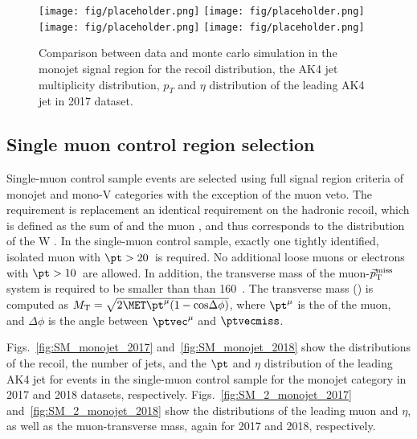 {\begin{figure}[htbp]
    \begin{center}
        \texttt{[image: fig/placeholder.png]}
        \texttt{[image: fig/placeholder.png]} \\
        \texttt{[image: fig/placeholder.png]}
        \texttt{[image: fig/placeholder.png]}
    \end{center}
    \caption{Comparison between data and monte carlo simulation in the monojet signal region for
        the recoil distribution, the AK4 jet multiplicity distribution,  $p_T$ and $\eta$
        distribution of the leading AK4  jet in 2017 dataset.}
    \label{fig:SR_pre_monoV_2018}
\end{figure}

\newpage

\subsection{Single muon control region selection}
\label{sec:selection_cr_1m}

Single-muon control sample events are selected using full signal region criteria of monojet and mono-V categories with the exception of the muon veto. The \ptmiss requirement is replacement an identical requirement on the hadronic recoil, which is defined as the sum of \ptvecmiss and the muon \vpt, and thus corresponds to the distribution of the W \pt.
In the single-muon control sample, exactly one tightly identified, isolated muon with $\pt > 20$~\GeV is required. 
No additional loose muons or electrons with $\pt > 10$~\GeV are allowed.
In addition, the transverse mass of the muon-$\vec p_{\rm T}^{\rm miss}$ system is required to be smaller than than 160~\GeV.
The transverse mass (\mt) is computed as $\mt = \sqrt{2\MET \pt^{\mu} (1 - \mathrm{cos}\Delta\phi)}$, where $\pt^{\mu}$ is the \pt of the muon, and $\Delta\phi$ is the angle between $\ptvec^{\mu}$ and $\ptvecmiss$.


Figs.~\ref{fig:SM_monojet_2017} and~\ref{fig:SM_monojet_2018} show the distributions of the recoil, the number of jets, and the $\pt$ and $\eta$ distribution of the leading AK4  jet
for events in the single-muon control sample for the monojet category in 2017 and 2018 datasets, respectively. Figs.~\ref{fig:SM_2_monojet_2017} and~\ref{fig:SM_2_monojet_2018} show the distributions of the leading muon \pt and $\eta$, as well as the muon-\ptmiss transverse mass, again for 2017 and 2018, respectively.


}

